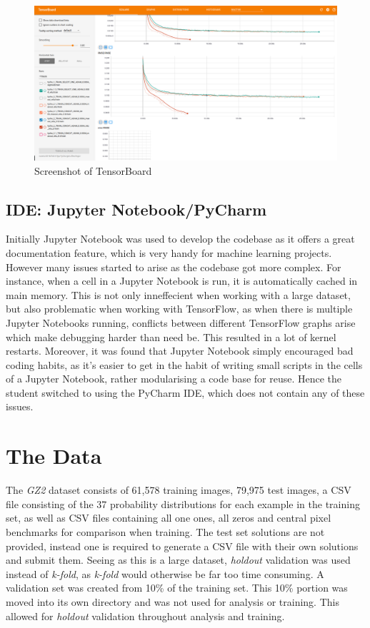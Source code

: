 \documentclass[12pt,a4paper,oneside,oldfontcommands]{memoir}
\begin{document}
    \begin{figure}[ht]
    \center
      \includegraphics[width=16cm]{images/tensor_board.png}
      \caption{Screenshot of TensorBoard}
      \label{fig:tb_sc}
    \end{figure}
      

\subsection{IDE: Jupyter Notebook/PyCharm}
Initially Jupyter Notebook was used to develop the codebase as it offers a great documentation feature, which is very handy for machine learning projects. However many issues started to arise as the codebase got more complex. For instance, when a cell in a Jupyter Notebook is run, it is automatically cached in main memory. This is not only inneffecient when working with a large dataset, but also problematic when working with TensorFlow, as when there is multiple Jupyter Notebooks running, conflicts between different TensorFlow graphs arise which make debugging harder than need be. This resulted in a lot of kernel restarts. Moreover, it was found that Jupyter Notebook simply encouraged bad coding habits, as it's easier to get in the habit of writing small scripts in the cells of a Jupyter Notebook, rather modularising a code base for reuse. Hence the student switched to using the PyCharm IDE, which does not contain any of these issues. 


\section{The Data}

The \textit{GZ2} dataset consists of 61,578 training images, 79,975 test images, a CSV file consisting of the 37 probability distributions for each example in the training set, as well as CSV files containing all one ones, all zeros and central pixel benchmarks for comparison when training. The test set solutions are not provided, instead one is required to generate a CSV file with their own solutions and submit them. Seeing as this is a large dataset, \textit{holdout} validation was used instead of \textit{k-fold}, as \textit{k-fold} would otherwise be far too time consuming. A validation set was created from 10\% of the training set. This 10\% portion was moved into its own directory and was not used for analysis or training. This allowed for \textit{holdout} validation throughout analysis and training.
\end{document}
